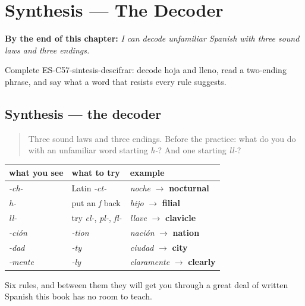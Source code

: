 
\chapter{Synthesis --- The Decoder}
\label{ch:synthesis-sound-laws}

\begin{chapteropening}
\textbf{By the end of this chapter:} \emph{I can decode unfamiliar Spanish with three sound laws and three endings.}

Complete ES-C57-sintesis-descifrar: decode hoja and lleno, read a two-ending phrase, and say what a word that resists every rule suggests.
\end{chapteropening}

\section[Practice]{Synthesis — the decoder}

\label{lesson:ES-C57-sintesis-descifrar}



\begin{quote}
Three sound laws and three endings. Before the practice: what do you do with an unfamiliar word starting \emph{h-}? And one starting \emph{ll-}?
\end{quote}

\begin{grammarlens}[title={What you've built}]
\noindent
\begin{tabularx}{\linewidth}{@{}>{\raggedright\arraybackslash}X>{\raggedright\arraybackslash}X>{\raggedright\arraybackslash}X@{}}
\toprule
\textbf{what you see} & \textbf{what to try} & \textbf{example} \\
\midrule
\emph{-ch-} & Latin \emph{-ct-} & \emph{noche} $\to$ \textbf{nocturnal} \\
\emph{h-} & put an \emph{f} back & \emph{hijo} $\to$ \textbf{filial} \\
\emph{ll-} & try \emph{cl-}, \emph{pl-}, \emph{fl-} & \emph{llave} $\to$ \textbf{clavicle} \\
\emph{-ción} & \emph{-tion} & \emph{nación} $\to$ \textbf{nation} \\
\emph{-dad} & \emph{-ty} & \emph{ciudad} $\to$ \textbf{city} \\
\emph{-mente} & \emph{-ly} & \emph{claramente} $\to$ \textbf{clearly} \\
\bottomrule
\end{tabularx}

Six rules, and between them they will get you through a great deal of written Spanish this book has no room to teach.
\end{grammarlens}

